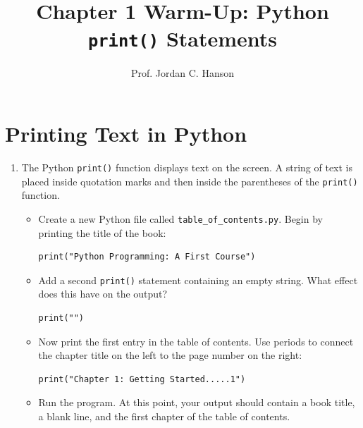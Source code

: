 \documentclass{article}
\begin{document}
\twocolumn

\title{Chapter 1 Warm-Up: Python \texttt{print()} Statements}
\author{Prof. Jordan C. Hanson}

\maketitle

\section{Printing Text in Python}

\begin{enumerate}
\item The Python \texttt{print()} function displays text on the screen.  A string of text is placed inside quotation marks and then inside the parentheses of the \texttt{print()} function.
\begin{itemize}

\item Create a new Python file called \texttt{table\_of\_contents.py}.  Begin by printing the title of the book:
\begin{verbatim}
print("Python Programming: A First Course")
\end{verbatim}
\vspace{0.25cm}

\item Add a second \texttt{print()} statement containing an empty string.  What effect does this have on the output?
\begin{verbatim}
print("")
\end{verbatim}
\vspace{0.25cm}

\item Now print the first entry in the table of contents.  Use periods to connect the chapter title on the left to the page number on the right:
\begin{verbatim}
print("Chapter 1: Getting Started.....1")
\end{verbatim}
\vspace{0.25cm}

\item Run the program.  At this point, your output should contain a book title, a blank line, and the first chapter of the table of contents. \\ \vspace{0.25cm}

\end{itemize}
\end{enumerate}
\end{document}
